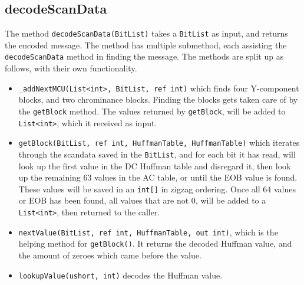 \subsection{decodeScanData}
The method \lstinline|decodeScanData(BitList)| takes a \lstinline|BitList| as input, and returns the encoded message.
The method has multiple submethod, each assisting the \lstinline|decodeScanData| method in finding the message. The methods are split up as follows, with their own functionality.
\begin{itemize}
	\item \lstinline|_addNextMCU(List<int>, BitList, ref int)| which finds four Y-component blocks, and two chrominance blocks. Finding the blocks gets taken care of by the \lstinline|getBlock| method. The values returned by \lstinline|getBlock|, will be added to \lstinline|List<int>|, which it received as input.
	\item \lstinline|getBlock(BitList, ref int, HuffmanTable, HuffmanTable)| which iterates through the scandata saved in the \lstinline|BitList|, and for each bit it has read, will look up the first value in the DC Huffman table and disregard it, then look up the remaining 63 values in the AC table, or until the EOB value is found.
	These values will be saved in an \lstinline|int[]| in zigzag ordering.
	Once all 64 values or EOB has been found, all values that are not 0, will be added to a \lstinline|List<int>|, then returned to the caller.
	\item \lstinline|nextValue(BitList, ref int, HuffmanTable, out int)|, which is the helping method for \lstinline|getBlock()|. It returns the decoded Huffman value, and the amount of zeroes which came before the value.
	\item \lstinline|lookupValue(ushort, int)| decodes the Huffman value.
\end{itemize}

